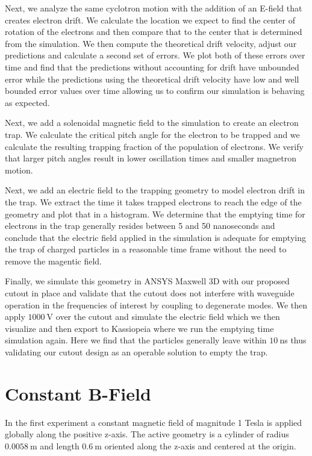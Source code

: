 \documentclass[12pt,letterpaper]{article}
\begin{document}
Next, we analyze the same cyclotron motion with the addition of an E-field that creates electron drift. We calculate the location we expect to find the center of rotation of the electrons and then compare that to the center that is determined from the simulation. We then compute the theoretical drift velocity, adjust our predictions and calculate a second set of errors. We plot both of these errors over time and find that the predictions without accounting for drift have unbounded error while the predictions using the theoretical drift velocity have low and well bounded error values over time allowing us to confirm our simulation is behaving as expected. 

Next, we add a solenoidal magnetic field to the simulation to create an electron trap. We calculate the critical pitch angle for the electron to be trapped and we calculate the resulting trapping fraction of the population of electrons. We verify that larger pitch angles result in lower oscillation times and smaller magnetron motion. 

Next, we add an electric field to the trapping geometry to model electron drift in the trap. We extract the time it takes trapped electrons to reach the edge of the geometry and plot that in a histogram. We determine that the emptying time for electrons in the trap generally resides between 5 and 50 nanoseconds and conclude that the electric field applied in the simulation is adequate for emptying the trap of charged particles in a reasonable time frame without the need to remove the magentic field. 

Finally, we simulate this geometry in ANSYS Maxwell 3D with our proposed cutout in place and validate that the cutout does not interfere with waveguide operation in the frequencies of interest by coupling to degenerate modes. We then apply $1000~$V over the cutout and simulate the electric field which we then visualize and then export to Kassiopeia where we run the emptying time simulation again. Here we find that the particles generally leave within $10~$ns thus validating our cutout design as an operable solution to empty the trap.

\section{Constant B-Field}

In the first experiment a constant magnetic field of magnitude 1 Tesla is applied globally along the positive z-axis. The active geometry is a cylinder of radius $0.0058~$m and length $0.6~$m oriented along the z-axis and centered at the origin.
\end{document}
